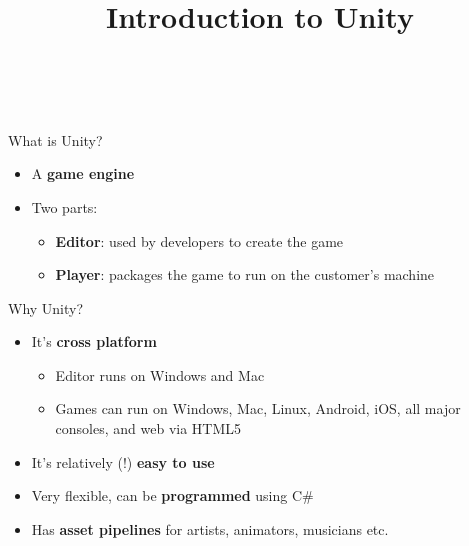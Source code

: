 \usepackage{../../beamerthemeFalmouthGamesAcademy}
\usepackage{multimedia}
\graphicspath{ {../../} }


\usepackage[normalem]{ulem}
\usepackage{wasysym}

\usepackage{pdfpages}

\usetikzlibrary{arrows,automata}




\title{Introduction to Unity}
\subtitle{\modulecode\ \moduletitle}

\frame{\titlepage} 

\begin{frame}{What is Unity?}
	\begin{itemize}
		\pause\item A \textbf{game engine}
		\pause\item Two parts:
			\begin{itemize}
				\pause\item \textbf{Editor}: used by developers to create the game
				\pause\item \textbf{Player}: packages the game to run on the customer's machine
			\end{itemize}
	\end{itemize}
\end{frame}

\begin{frame}{Why Unity?}
	\begin{itemize}
		\pause\item It's \textbf{cross platform}
			\begin{itemize}
				\pause\item Editor runs on Windows and Mac
				\pause\item Games can run on Windows, Mac, Linux, Android, iOS, all major consoles, and web via HTML5
			\end{itemize}
		\pause\item It's relatively (!) \textbf{easy to use}
		\pause\item Very flexible, can be \textbf{programmed} using C\#
		\pause\item Has \textbf{asset pipelines} for artists, animators, musicians etc.
	\end{itemize}
\end{frame}

